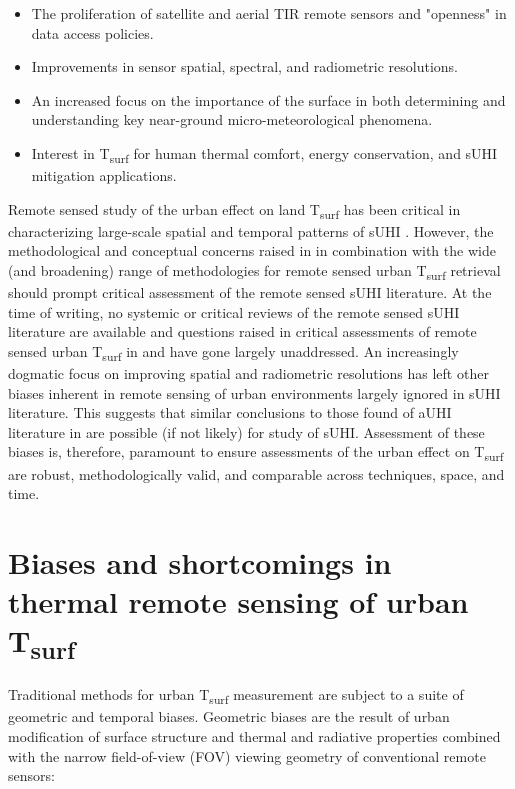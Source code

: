 \begin{bibunit}
\begin{itemize}
	\item The proliferation of satellite and aerial TIR remote sensors and "openness" in data access policies.
	\item Improvements in sensor spatial, spectral, and radiometric resolutions. 
	\item An increased focus on the importance of the surface in both determining and understanding key near-ground micro-meteorological phenomena.
	\item Interest in T\textsubscript{surf} for human thermal comfort, energy conservation, and sUHI mitigation applications. 
\end{itemize}

Remote sensed study of the urban effect on land T\textsubscript{surf} has been critical in characterizing large-scale spatial and temporal patterns of sUHI \citep{Peng2012, Streutker2003, Imhoff2010}. However, the methodological and conceptual concerns raised in \citet{Stewart2011} in combination with the wide (and broadening) range of methodologies for remote sensed urban T\textsubscript{surf} retrieval should prompt critical assessment of the remote sensed sUHI literature. At the time of writing, no systemic or critical reviews of the remote sensed sUHI literature are available and questions raised in critical assessments of remote sensed urban T\textsubscript{surf} in \cite{Roth1989} and \cite{Voogt2003} have gone largely unaddressed. An increasingly dogmatic focus on improving spatial and radiometric resolutions has left other biases inherent in remote sensing of urban environments largely ignored in sUHI literature. This suggests that similar conclusions to those found of aUHI literature in \citet{Stewart2011} are possible (if not likely) for study of sUHI. Assessment of these biases is, therefore, paramount to ensure assessments of the urban effect on T\textsubscript{surf} are robust, methodologically valid, and comparable across techniques, space, and time.

\section{Biases and shortcomings in thermal remote sensing of urban T\textsubscript{surf}}

Traditional methods for urban T\textsubscript{surf} measurement are subject to a suite of geometric and temporal biases. Geometric biases are the result of urban modification of surface structure and thermal and radiative properties combined with the  narrow field-of-view (FOV) viewing geometry of conventional remote sensors:


\end{bibunit}
